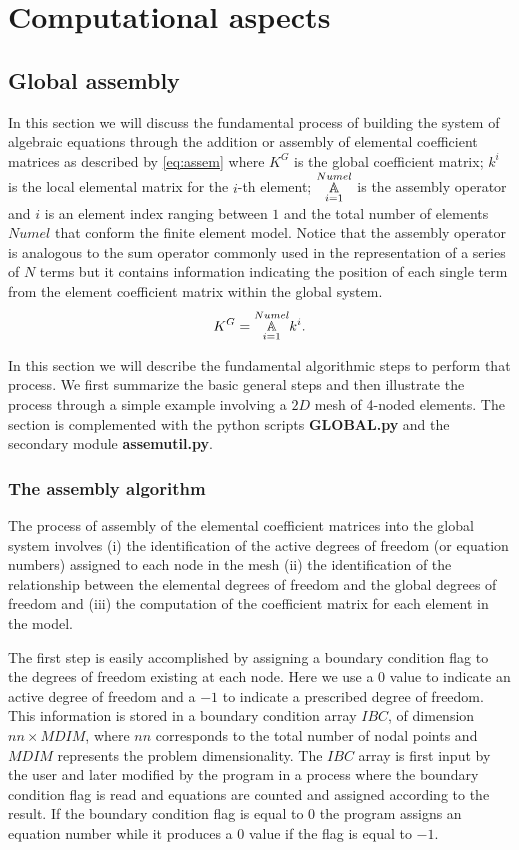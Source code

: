 %
\graphicspath{ {./img/COMPU/} }
\chapter{Computational aspects}
\section{Global assembly}
In this section we will discuss the fundamental process of building the system of algebraic equations through the addition or assembly of elemental coefficient matrices as described by \cref{eq:assem} where $K^G$ is the global coefficient matrix; $k^i$ is the local elemental matrix for the $i$-th element; $\assem{i=1}{Numel}$ is the assembly operator and $i$ is an element index ranging between $1$ and the total number of elements $Numel$ that conform the finite element model. Notice that the assembly operator is analogous to the sum operator commonly used in the representation of a series of $N$ terms but it contains information indicating the position of each single term from the element coefficient matrix within the global system.
\begin{equation}\label{eq:assem}
{K^G}=\assem{i=1}{Numel} k^i.
\end{equation}

In this section we will describe the fundamental algorithmic steps to perform that process. We first summarize the basic general steps and then illustrate the process through a simple example involving a $2D$ mesh of 4-noded elements. The section is complemented with the python scripts {\bf GLOBAL.py} and the secondary module {\bf assemutil.py}.

\subsection*{The assembly algorithm}
The process of assembly of the elemental coefficient matrices into the global system involves (i) the identification of the active degrees of freedom (or equation numbers) assigned to each node in the mesh (ii) the identification of the relationship between the elemental degrees of freedom and the global degrees of freedom and (iii) the computation of the coefficient matrix for each element in the model.

The first step is easily accomplished by assigning a boundary condition flag to the degrees of freedom existing at each node. Here we use a $0$ value to indicate an active degree of freedom and a $-1$ to indicate a prescribed degree of freedom. This information is stored in a boundary condition array $IBC$, of dimension $nn \times MDIM$, where $nn$ corresponds to the  total number of nodal points and $MDIM$ represents the problem dimensionality. The $IBC$ array is first input by the user and later modified by the program in a process where the boundary condition flag is read and equations are counted and assigned according to the result. If the boundary condition flag is equal to $0$ the program assigns an equation number while it produces a $0$ value if the flag is equal to $-1$.


